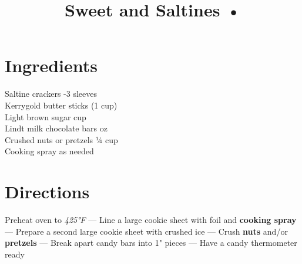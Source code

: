 \documentclass[11pt,letterpaper]{article}
\title{Sweet and Saltines •}
\author{}
\date{}
\begin{document}
\maketitle
\thispagestyle{empty}

\section*{Ingredients}
\setlength{\columnsep}{20pt}
\begin{multicols}{2}
\noindent
    Saltine crackers -3 sleeves \\
    Kerrygold butter  sticks (1 cup) \\
    Light brown sugar  cup \\
    Lindt milk chocolate bars  oz\\
    Crushed nuts or pretzels \dotfill ¼ cup \\
    Cooking spray \dotfill as needed
\end{multicols}

\section*{Directions}

\noindent
Preheat oven to \textit{425°F} ---
Line a large cookie sheet with foil and \textbf{cooking spray}---
Prepare a second large cookie sheet with crushed ice ---
Crush \textbf{nuts} and/or \textbf{pretzels} ---
Break apart candy bars into 1" pieces ---
Have a candy thermometer ready
\end{document}
